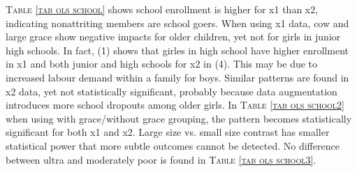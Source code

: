 \begin{palepinkleftbar}
\begin{finding}
\textsc{\small Table \ref{tab ols school}} shows school enrollment is higher for \textsf{x1} than \textsf{x2}, indicating nonattriting members are school goers. When using \textsf{x1} data, \textsf{cow} and \textsf{large grace} show negative impacts for older children, yet not for girls in junior high schools. In fact, (1) shows that girles in high school have higher enrollment in \textsf{x1} and both junior and high schools for \textsf{x2} in (4). This may be due to increased labour demand within a family for boys. Similar patterns are found in \textsf{x2} data, yet not statistically significant, probably because data augmentation introduces more school dropouts among older girls. In \textsc{\small Table \ref{tab ols school2}} when using with grace/without grace grouping, the pattern becomes statistically significant for both \textsf{x1} and \textsf{x2}. Large size vs. small size contrast has smaller statistical power that more subtle outcomes cannot be detected. No difference between ultra and moderately poor is found in \textsc{\small Table \ref{tab ols school3}}.
\end{finding}
\end{palepinkleftbar}




